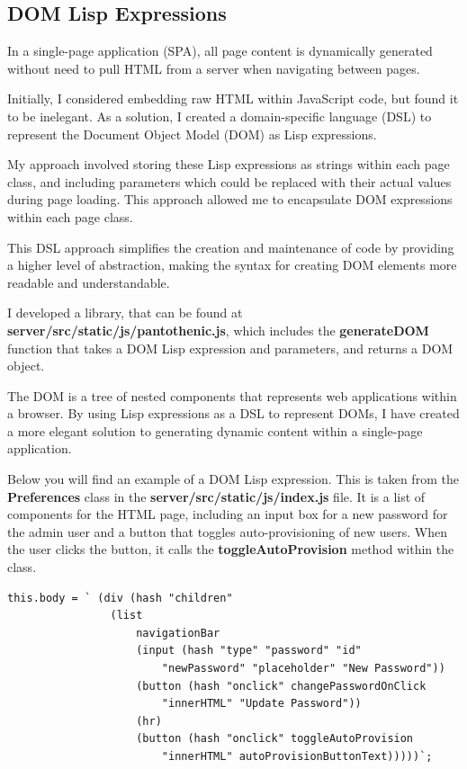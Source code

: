 
\subsection{DOM Lisp Expressions}
In a single-page application (SPA), all page content is dynamically generated without
need to pull HTML from a server when navigating between pages.

Initially, I considered embedding raw HTML within JavaScript code, but found it to be inelegant.
As a solution, I created a domain-specific language (DSL) to represent the Document Object Model (DOM) as Lisp expressions.

My approach involved storing these Lisp expressions as strings within each page class,
and including parameters which could be replaced with their actual values during page loading.
This approach allowed me to encapsulate DOM expressions within each page class.

This DSL approach simplifies the creation and maintenance of code by providing a higher level of abstraction,
making the syntax for creating DOM elements more readable and understandable.

I developed a library, that can be found at \textbf{server/src/static/js/pantothenic.js},
which includes the \textbf{generateDOM} function that takes a DOM Lisp expression and parameters,
and returns a DOM object.

The DOM is a tree of nested components that represents web applications within a browser.
By using Lisp expressions as a DSL to represent DOMs,
I have created a more elegant solution to generating dynamic
content within a single-page application.

Below you will find an example of a DOM Lisp expression.
This is taken from the \textbf{Preferences} class in the \textbf{server/src/static/js/index.js} file.
It is a list of components for the HTML page,
including an input box for a new password for the admin user
and a button that toggles auto-provisioning of new users.
When the user clicks the button, it calls the \textbf{toggleAutoProvision} method within the class.

\begin{lstlisting}
this.body = ` (div (hash "children"
                (list
                    navigationBar
                    (input (hash "type" "password" "id"
                        "newPassword" "placeholder" "New Password"))
                    (button (hash "onclick" changePasswordOnClick
                        "innerHTML" "Update Password"))
                    (hr)
                    (button (hash "onclick" toggleAutoProvision
                        "innerHTML" autoProvisionButtonText)))))`;
\end{lstlisting}

